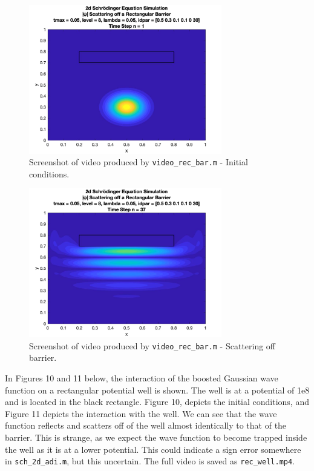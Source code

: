 \documentclass[10pt]{article}
\def\code#1{\texttt{#1}} %
\begin{document}
\begin{figure}[H]
\centering
\includegraphics[width=0.75\textwidth]{problem2/rec_bar_1.png}
\caption{Screenshot of video produced by \code{video\_rec\_bar.m} - Initial conditions.}
\end{figure}
\begin{figure}[H]
\centering
\includegraphics[width=0.75\textwidth]{problem2/rec_bar_2.png}
\caption{Screenshot of video produced by \code{video\_rec\_bar.m} - Scattering off barrier.}
\end{figure}

In Figures 10 and 11 below, the interaction of the boosted Gaussian wave function on a rectangular
potential well is shown. The well is at a potential of 1e8 and is located in the black rectangle.
Figure 10, depicts the initial conditions, and Figure 11 depicts the 
interaction with the well. We can see that the wave function reflects and scatters off of the well 
almost identically to that of the barrier. This is strange, as we expect the wave function to become
trapped inside the well as it is at a lower potential. This could indicate a sign error somewhere in 
\code{sch\_2d\_adi.m}, but this uncertain. The full video is saved as \code{rec\_well.mp4}.
\end{document}
